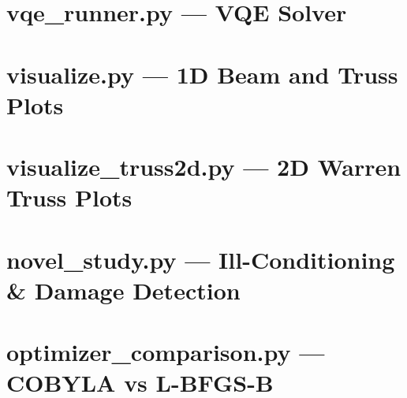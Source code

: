 \documentclass[12pt, a4paper]{article}
\begin{document}
\section{vqe\_runner.py --- VQE Solver}



\section{visualize.py --- 1D Beam and Truss Plots}



\section{visualize\_truss2d.py --- 2D Warren Truss Plots}



\section{novel\_study.py --- Ill-Conditioning \& Damage Detection}



\section{optimizer\_comparison.py --- COBYLA vs L-BFGS-B}
\end{document}
